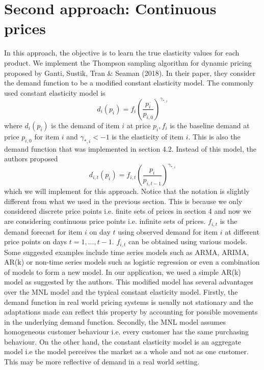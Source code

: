 \documentclass[a4paper]{article}
\begin{document}
\section{Second approach: Continuous prices}
In this approach, the objective is to learn the true elasticity values for each product. We implement the Thompson sampling algorithm for dynamic pricing proposed by Ganti, Sustik, Tran \& Seaman (2018). In their paper, they consider the demand function to be a modified constant elasticity model. The commonly used constant elasticity model is 
\[d_i(p_i) = f_i \left(\frac{p_i}{p_{i,0}}\right)^{\gamma_{*,i}} \tag{1} \] 
where $d_i(p_i)$ is the demand of item $i$ at price $p_{i}, f_i$ is the baseline demand at price $p_{i,0}$ for item $i$ and $\gamma_{*,i} < -1$ is the elasticity of item $i$. This is also the demand function that was implemented in section 4.2. Instead of this model, the authors proposed 
\[d_{i,t}(p_i) = f_{i,t} \left(\frac{p_i}{p_{i,t-1}}\right)^{\gamma_{*,i}} \tag{2}\]
which we will implement for this approach. Notice that the notation is slightly different from what we used in the previous section. This is because we only considered discrete price points i.e. finite sets of prices in section 4 and now we are considering continuous price points i.e. infinite sets of prices. $f_{i,t}$ is the demand forecast for item $i$ on day $t$ using observed demand for item $i$ at different price points on days $t = 1,..., t-1$. $f_{i,t}$ can be obtained using various models. Some suggested examples include time series models such as ARMA, ARIMA, AR(k) or non-time series models such as logistic regression or even a combination of models to form a new model. In our application, we used a simple AR(k) model as suggested by the authors.
\newline
\newline
This modified model has several advantages over the MNL model and the typical constant elasticity model. Firstly, the demand function in real world pricing systems is usually not stationary and the adaptations made can reflect this property by accounting for possible movements in the underlying demand function. Secondly, the MNL model assumes homogeneous customer behaviour i.e. every customer has the same purchasing behaviour. On the other hand, the constant elasticity model is an aggregate model i.e the model perceives the market as a whole and not as one customer. This may be more reflective of demand in a real world setting.
\newline
\newline
\end{document}
